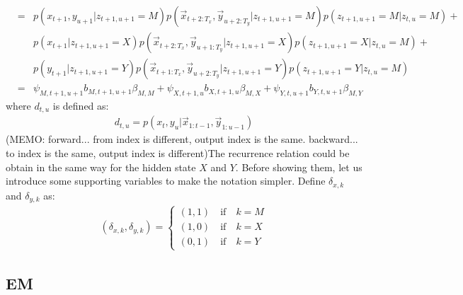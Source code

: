 \begin{eqnarray}
            &=& p(x_{t+1}, y_{u+1}|z_{t+1, u+1}=M)p(\vec{x}_{t+2:T_x}, \vec{y}_{u+2:T_y}|z_{t+1, u+1}=M) p(z_{t+1, u+1} = M| z_{t, u}= M) +\nonumber \\ 
            && p(x_{t+1}|z_{t+1, u+1}=X)p(\vec{x}_{t+2:T_x}, \vec{y}_{u+1:T_y}|z_{t+1, u+1}=X) p(z_{t+1, u+1} = X| z_{t, u}= M) + \nonumber \\ 
            && p(y_{t+1}|z_{t+1, u+1}=Y)p(\vec{x}_{t+1:T_x}, \vec{y}_{u+2:T_y}|z_{t+1, u+1}=Y) p(z_{t+1, u+1} = Y| z_{t, u}= M) \nonumber \\ 
            &=& \psi_{M, t+1, u+1} b_{M, t+1, u+1} \beta_{M,M} + \psi_{X, t+1, u} b_{X, t+1, u} \beta_{M,X} + \psi_{Y, t, u+1} b_{Y, t, u+1} \beta_{M,Y}
\end{eqnarray}
where $d_{t,u}$ is defined as:
\begin{eqnarray}
  d_{t,u} = {p(x_t, y_u | \vec{x}_{1:t-1}, \vec{y}_{1:u-1})} 
\end{eqnarray}
(MEMO: forward... from index is different, output index is the same. backward... to index is the same, output index is different)The recurrence relation could be obtain in the same way for the hidden state $X$ and $Y$. Before showing them, let us introduce some supporting variables to make the notation simpler. Define $\delta_{x,k}$ and $\delta_{y,k}$ as:
\begin{eqnarray}
(\delta_{x, k}, \delta_{y, k}) =  
  \begin{cases}
    (1,1) \quad \mbox{if} \quad k = M \\
    (1,0) \quad \mbox{if} \quad k = X \\
    (0,1) \quad \mbox{if} \quad k = Y
  \end{cases}
\end{eqnarray}



\subsection{EM}


